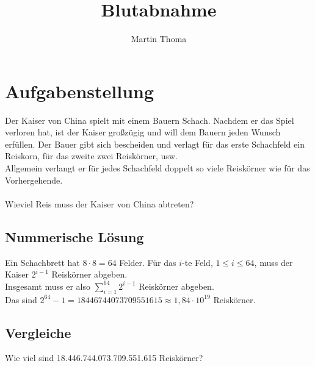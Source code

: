 \documentclass[a4paper,9pt]{scrartcl}
\begin{document}
 \title{Blutabnahme}
 \author{Martin Thoma}

 \setcounter{section}{1}
 \section*{Aufgabenstellung}
    Der Kaiser von China spielt mit einem Bauern Schach. Nachdem er das Spiel
    verloren hat, ist der Kaiser großzügig und will dem Bauern jeden Wunsch
    erfüllen. Der Bauer gibt sich bescheiden und verlagt für das erste
    Schachfeld ein Reiskorn, für das zweite zwei Reiskörner, usw. \\
    Allgemein verlangt er für jedes Schachfeld doppelt so viele Reiskörner
    wie für das Vorhergehende.\\
    \\
    Wieviel Reis muss der Kaiser von China abtreten?
 \subsection*{Nummerische Lösung}
    Ein Schachbrett hat $8 \cdot 8 = 64$ Felder. Für das $i$-te Feld,
    $1 \le i \le 64$, muss der Kaiser $2^{i-1}$ Reiskörner abgeben. \\
    Insgesamt muss er also $\sum_{i=1}^{64} 2^{i-1}$ Reiskörner abgeben.\\
    Das sind
    $2^{64} - 1 = 18446744073709551615 \approx 1{,}84 \cdot 10^{19} $
    Reiskörner.
 \subsection*{Vergleiche}
    Wie viel sind 18.446.744.073.709.551.615 Reiskörner?\\
\end{document}
